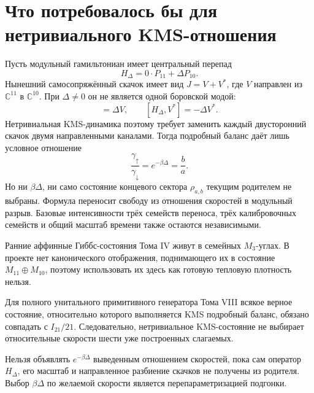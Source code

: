 \section{Что потребовалось бы для нетривиального KMS-отношения}

Пусть модульный гамильтониан имеет центральный перепад
\begin{equation}
 H_\Delta=0\cdot P_{11}+\Delta P_{10}.
\end{equation}
Нынешний самосопряжённый скачок имеет вид $J=V+V^*$, где $V$ направлен из
$\mathbb C^{11}$ в $\mathbb C^{10}$. При $\Delta\neq0$ он не является одной
боровской модой:
\begin{equation}
 [H_\Delta,V]=\Delta V,
 \qquad
 [H_\Delta,V^*]=-\Delta V^*.
 \label{eq:v8-directed-bohr-split}
\end{equation}
Нетривиальная KMS-динамика поэтому требует заменить каждый двусторонний
скачок двумя направленными каналами. Тогда подробный баланс даёт лишь
условное отношение
\begin{equation}
 \frac{\gamma_\uparrow}{\gamma_\downarrow}
 =e^{-\beta\Delta}
 =\frac ba.
 \label{eq:v8-kms-directed-rate-ratio}
\end{equation}
Но ни $\beta\Delta$, ни само состояние концевого сектора $\rho_{a,b}$ текущим
родителем не выбраны. Формула переносит свободу из отношения скоростей в
модульный разрыв. Базовые интенсивности трёх семейств переноса, трёх
калибровочных семейств и общий масштаб времени также остаются независимыми.

Ранние аффинные Гиббс-состояния Тома IV живут в семейных $M_3$-углах. В
проекте нет канонического отображения, поднимающего их в состояние
$M_{11}\oplus M_{10}$, поэтому использовать их здесь как готовую тепловую
плотность нельзя.

\begin{theorem}
Для полного унитального примитивного генератора Тома VIII всякое верное
состояние, относительно которого выполняется KMS подробный баланс, обязано
совпадать с $I_{21}/21$. Следовательно, нетривиальное KMS-состояние не
выбирает относительные скорости шести уже построенных слагаемых.
\end{theorem}

\begin{nogocriterion}
Нельзя объявлять $e^{-\beta\Delta}$ выведенным отношением скоростей, пока
сам оператор $H_\Delta$, его масштаб и направленное разбиение скачков не
получены из родителя. Выбор $\beta\Delta$ по желаемой скорости является
перепараметризацией подгонки.
\end{nogocriterion}

